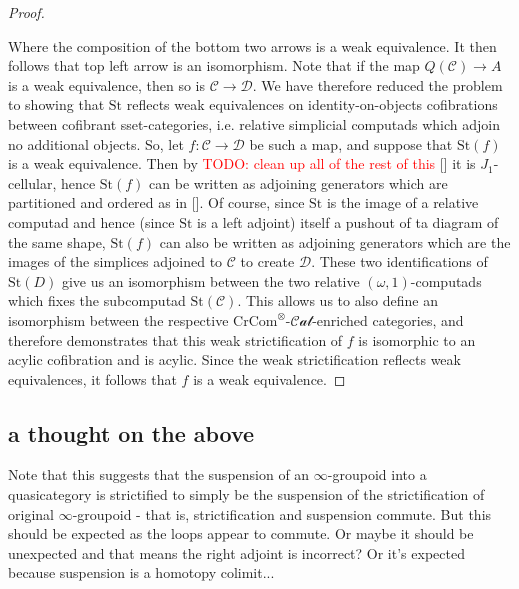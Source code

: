 \documentclass[12pt]{article}
\theoremstyle{definition}
\newcommand{\TODO}[1]{\textcolor{red}{TODO: {#1}}}
\newcommand{\C}{\mathcal{C}}
\newcommand{\D}{\mathcal{D}}
\newcommand{\crcom}{\text{CrCom}}
\newcommand{\tensorcrossedcat}{\crcom^\otimes\text{-}\mathcal{Cat}}
\newcommand{\st}{\text{St}}
\begin{document}
\begin{proof}
\begin{center}
		\end{center}
		Where the composition of the bottom two arrows is a weak equivalence. It then follows that top left arrow is an isomorphism. Note that if the map $Q(\C) \to A$ is a weak equivalence, then so is $\C \to \D$. 
		We have therefore reduced the problem to showing that $\st$ reflects weak equivalences on identity-on-objects cofibrations between cofibrant sset-categories, i.e. relative simplicial computads which adjoin no additional objects. 
		So, let $f: \C \to \D$ be such a map, and suppose that $\st(f)$ is a weak equivalence. Then by \TODO{clean up all of the rest of this} [] it is $J_1$-cellular, hence $\st(f)$ can be written as adjoining generators which are partitioned and ordered as in [].
		Of course, since $\st$ is the image of a relative computad and hence (since $\st$ is a left adjoint) itself a pushout of ta diagram of the same shape, $\st(f)$ can also be written as adjoining generators which are the images of the simplices adjoined to $\C$ to create $\D$. These two identifications of $\st(D)$ give us an isomorphism between the two relative $(\omega,1)$-computads which fixes the subcomputad $\st(\C)$. This allows us to also define an isomorphism between the respective $\tensorcrossedcat$-enriched categories, and therefore demonstrates that this weak strictification of $f$ is isomorphic to an acylic cofibration and is acylic. Since the weak strictification reflects weak equivalences, it follows that $f$ is a weak equivalence. 
	\end{proof}
\subsection{a thought on the above}
		Note that this suggests that the suspension of an $\infty$-groupoid into a quasicategory is strictified to simply be the suspension of the strictification of original $\infty$-groupoid - that is, strictification and suspension commute. But this should be expected as the loops appear to commute. Or maybe it should be unexpected and that means the right adjoint is incorrect? Or it's expected because suspension is a homotopy colimit...
\end{document}
